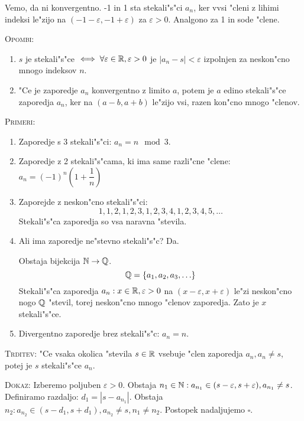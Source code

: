 Vemo, da ni konvergentno. -1 in 1 sta stekali"s"ci $a_n$, ker vvsi "cleni z lihimi indeksi le"zijo na $(-1 - \varepsilon, -1 + \varepsilon)$ za $\varepsilon > 0$. Analgono za 1 in sode "clene.

\textsc{Opombi:}
\begin{enumerate}[1)]
	\item $s$ je stekali"s"ce $\iff \forall \varepsilon \in \mathbb{R}, \varepsilon > 0$ je $|a_n - s| < \varepsilon$ izpolnjen za neskon"cno mnogo indeksov $n$.
	
	\item "Ce je zaporedje $a_n$ konvergentno z limito $a$, potem je $a$ edino stekali"s"ce zaporedja $a_n$, ker na $(a-b, a+b)$ le"zijo vsi, razen kon"cno mnogo "clenov.
\end{enumerate}

\textsc{Primeri:}
\begin{enumerate}[1)]
	\item Zaporedje s 3 stekali"s"ci: $a_n = n \mod3$.
	\item Zaporedje z 2 stekali"s"cama, ki ima same razli"cne "clene: $a_n = (-1)^n \left(1+ \dfrac{1}{n}\right)$
	\item Zaporejde z neskon"cno stekali"s"ci:
	\begin{equation*}
	1, 1, 2, 1, 2, 3, 1, 2, 3, 4, 1, 2, 3, 4, 5, \ldots
	\end{equation*}
	Stekali"s"ca zaporedja so vsa naravna "stevila.
	\item Ali ima zaporedje ne"stevno stekali"s"c? Da.
	
	Obstaja bijekcija $\mathbb{N} \rightarrow \mathbb{Q}$.
	\begin{equation*}
	\mathbb{Q} = \{a_1, a_2, a_3, \ldots\}
	\end{equation*}
	Stekali"s"ca zaporedja $a_n: x \in \mathbb{R},  \varepsilon > 0$ na $(x-\varepsilon, x+\varepsilon)$ le"zi neskon"cno nogo $\mathbb{Q}$ "stevil, torej neskon"cno mnogo "clenov zaporedja. Zato je $x$ stekali"s"ce.
	
	\item Divergentno zaporedje brez stekali"s"c: $a_n = n$.
\end{enumerate}

\textsc{Trditev: } "Ce vsaka okolica "stevila $s \in \mathbb{R}$ vsebuje "clen zaporedja $a_n, a_n \neq s$, potej je $s$ stekali"s"ce $a_n$.

\textsc{Dokaz: } Izberemo poljuben $\varepsilon > 0$. Obstaja $n_1 \in \mathbb{N}: a_{n_1} \in (s-\varepsilon, s+\varepsilon), a_{n_1} \neq s$. Definiramo razdaljo: $d_1 = |s - a_{n_1}|$. Obstaja $n_2: a_{n_2} \in (s-d_1, s+d_1), a_{n_2} \neq s, n_1 \neq n_2$. Postopek nadaljujemo $\square$.

